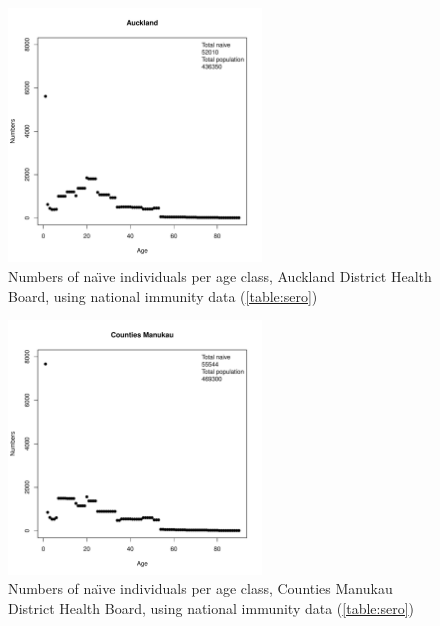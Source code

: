 \documentclass{article}
\begin{document}
\begin{figure}[H]
     \begin{center}
     \includegraphics[width=0.6\textwidth]{dhb3.pdf}
     \end{center}
     \caption{Numbers of na\"{\i}ve individuals per age class, Auckland District Health Board, using national immunity data (\autoref{table:sero})}
     \label{fig:Auckland}
\end{figure}

\begin{figure}[H]
     \begin{center}
     \includegraphics[width=0.6\textwidth]{dhb4.pdf}
     \end{center}
     \caption{Numbers of na\"{\i}ve individuals per age class, Counties Manukau District Health Board, using national immunity data (\autoref{table:sero})}
     \label{fig:Counties_Manukau}
\end{figure}
\end{document}
